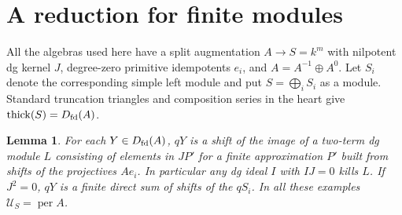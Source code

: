 \documentclass[11pt]{article}
\newtheorem{lem}[thm]{Lemma}
\newcommand{\Dfd}{D_{\rm fd}}
\newcommand{\per}{\operatorname{per}}
\newcommand{\thick}{\operatorname{thick}}
\newcommand{\UU}{\mathcal U}
\begin{document}
\section{A reduction for finite modules}
All the algebras used here have a split augmentation $A\to S=k^m$ with
nilpotent dg kernel $J$, degree-zero primitive idempotents $e_i$, and
$A=A^{-1}\oplus A^0$. Let $S_i$ denote the corresponding simple left
module and put $S=\bigoplus_i S_i$ as a module. Standard truncation
triangles and composition series in the heart give $\thick(S)=\Dfd(A)$.

\begin{lem}\label{cut}
For each $Y\in\Dfd(A)$, $qY$ is a shift of the image of a two-term
dg module $L$ consisting of elements in $JP'$ for a finite approximation $P'$ built
from shifts of the projectives $Ae_i$. In particular any dg ideal
$I$ with $IJ=0$ kills $L$. If $J^2=0$, $qY$ is a finite direct sum of
shifts of the $qS_i$. In all these examples $\UU_S=\per A$.
\end{lem}
\end{document}
